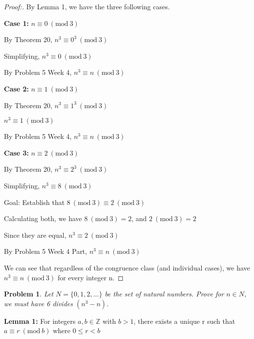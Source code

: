 \documentclass[12pt]{article}
\newtheorem{theorem}{Problem}[section]
\newcommand{\Mod}[1]{\ (\mathrm{mod}\ #1)}
\begin{document}
\begin{proof}[Proof:]
    By Lemma 1, we have the three following cases.

    \textbf{Case 1:} $n \equiv 0 \Mod{3}$

    By Theorem 20, $n^3 \equiv 0^3 \Mod{3}$

    Simplifying, $n^3 \equiv 0 \Mod{3}$

    By Problem 5 Week 4, $n^3 \equiv n \Mod{3}$

    \textbf{Case 2:} $n \equiv 1 \Mod{3}$

    By Theorem 20, $n^3 \equiv 1^3 \Mod{3}$

    $n^3 \equiv 1 \Mod{3}$

    By Problem 5 Week 4, $n^3 \equiv n \Mod{3}$

    \textbf{Case 3:} $n \equiv 2 \Mod{3}$

    By Theorem 20, $n^3 \equiv 2^3 \Mod{3}$

    Simplifying, $n^3 \equiv 8 \Mod{3}$

    Goal: Establish that $8 \Mod{3} \equiv 2 \Mod{3}$

    Calculating both, we have $8 \Mod{3} = 2$, and $2 \Mod{3} = 2$

    Since they are equal, $n^3 \equiv 2 \Mod{3}$

    By Problem 5 Week 4 Part, $n^3 \equiv n \Mod{3}$

    \medskip
    
    We can see that regardless of the congruence class (and individual cases), we have $n^3 \equiv n \Mod{3}$ for every integer n.
\end{proof}

\newpage

\begin{theorem}
    Let $N = \{ 0, 1, 2, . . . \} $ be the set of natural numbers. Prove for $n \in N$, we must
have 6 divides $(n^3 - n)$.
\end{theorem}

\textbf{Lemma 1:} For integers $a, b \in \mathbb{Z}$ with $b > 1$, there exists a unique r such that $a \equiv r \Mod{b}$ where $0 \le r < b$
\end{document}
